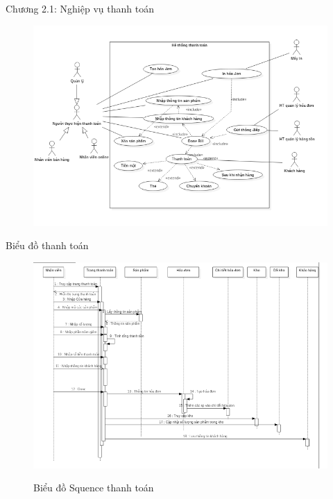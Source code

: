 \documentclass{beamer}
\begin{document}
\begin{frame}{Chương 2.1: Nghiệp vụ thanh toán}
    \begin{figure}[htp]
        \centering
        \includegraphics[scale=0.5]{4.png}
    \end{figure}
\end{frame}
\begin{frame}{Biểu đồ thanh toán}
        \begin{figure}
    \centering
    \includegraphics[scale = 0.5]{8.png}\\
    \fontsize{12}{20}\selectfont\caption{Biểu đồ Squence thanh toán}
    
\end{figure}
\end{frame}
\end{document}
